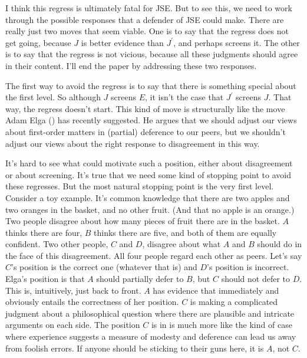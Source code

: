 \documentclass[
  11pt,
  letterpaper,
  DIV=11,
  numbers=noendperiod,
  oneside]{scrartcl}
\begin{document}
I think this regress is ultimately fatal for JSE. But to see this, we
need to work through the possible responses that a defender of JSE could
make. There are really just two moves that seem viable. One is to say
that the regress does not get going, because \(J\) is better evidence
than \(J^\prime\), and perhaps screens it. The other is to say that the
regress is not vicious, because all these judgments should agree in
their content. I'll end the paper by addressing these two responses.

The first way to avoid the regress is to say that there is something
special about the first level. So although \(J\) screens \(E\), it isn't
the case that \(J^\prime\) screens \(J\). That way, the regress doesn't
start. This kind of move is structurally like the move Adam Elga
() has recently suggested. He argues
that we should adjust our views about first-order matters in (partial)
deference to our peers, but we shouldn't adjust our views about the
right response to disagreement in this way.

It's hard to see what could motivate such a position, either about
disagreement or about screening. It's true that we need some kind of
stopping point to avoid these regresses. But the most natural stopping
point is the very first level. Consider a toy example. It's common
knowledge that there are two apples and two oranges in the basket, and
no other fruit. (And that no apple is an orange.) Two people disagree
about how many pieces of fruit there are in the basket. \(A\) thinks
there are four, \(B\) thinks there are five, and both of them are
equally confident. Two other people, \(C\) and \(D\), disagree about
what \(A\) and \(B\) should do in the face of this disagreement. All
four people regard each other as peers. Let's say \(C\)'s position is
the correct one (whatever that is) and \(D\)'s position is incorrect.
Elga's position is that \(A\) should partially defer to \(B\), but \(C\)
should not defer to \(D\). This is, intuitively, just back to front.
\(A\) has evidence that immediately and obviously entails the
correctness of her position. \(C\) is making a complicated judgment
about a philosophical question where there are plausible and intricate
arguments on each side. The position \(C\) is in is much more like the
kind of case where experience suggests a measure of modesty and
deference can lead us away from foolish errors. If anyone should be
sticking to their guns here, it is \(A\), not \(C\).
\end{document}
